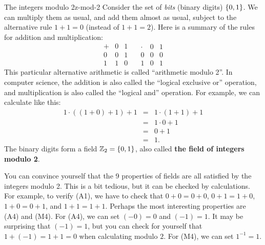 \begin{example}{The integers modulo 2}{z-mod-2}
  Consider the set of {\em bits} (binary digits) $\{0,1\}$.
  We can multiply them as usual, and add them almost as usual, subject
  to the alternative rule $1+1=0$ (instead of $1+1=2$). Here is a
  summary of the rules for addition and multiplication:
  \begin{equation*}
    \begin{array}{l|ll}
      +&0&1 \\\hline
      0&0&1 \\
      1&1&0
    \end{array}
    \quad
    \begin{array}{l|ll}
      \cdot&0&1 \\\hline
      0&0&0 \\
      1&0&1
    \end{array}
  \end{equation*}
  This particular alternative arithmetic is called ``arithmetic modulo
  2''.   In computer science, the addition is also called the ``logical
  exclusive or'' operation, and multiplication is also called the
  ``logical and'' operation.  For example, we can calculate like this:
  \begin{equation*}
    \begin{array}{lll}
      1\cdot((1+0)+1) + 1 &=& 1\cdot(1+1) + 1\\
                          &=& 1\cdot 0 + 1\\
                          &=& 0 + 1\\
                          &=& 1.
    \end{array}
  \end{equation*}
  The binary digits form a field $\mathbb{Z}_2 = \{0,1\}$, also
  called \textbf{the field of integers modulo 2}.
\end{example}

You can convince yourself that the 9 properties of fields are all
satisfied by the integers modulo 2. This is a bit tedious, but it can
be checked by calculations.  For example, to verify (A1), we have to
check that $0+0=0+0$, $0+1=1+0$, $1+0=0+1$, and $1+1=1+1$. Perhaps the
most interesting properties are (A4) and (M4). For (A4), we can set
$(-0)=0$ and $(-1)=1$. It may be surprising that $(-1)=1$, but you can
check for yourself that $1+(-1)=1+1=0$ when calculating modulo
$2$. For (M4), we can set $1^{-1} = 1$.


